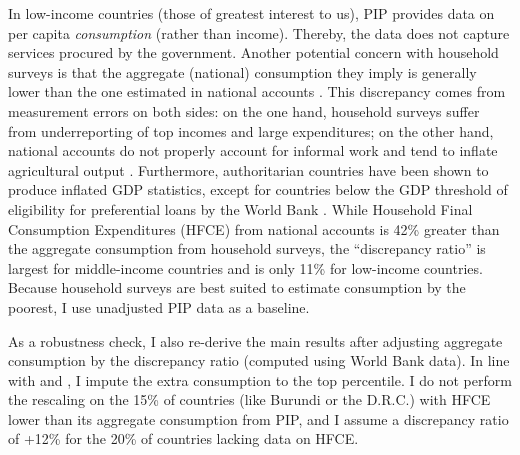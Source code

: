 In low-income countries (those of greatest interest to us), PIP provides data on per capita \textit{consumption} (rather than income). Thereby, the data does not capture services procured by the government. %
Another potential concern with household surveys is that the aggregate (national) consumption they imply is generally lower than the one estimated in national accounts \citep{deaton_measuring_2005,prydz_disparities_2022,hlasny_impact_2022}. This discrepancy comes from measurement errors on both sides: on the one hand, household surveys suffer from underreporting of top incomes and large expenditures; on the other hand, national accounts do not properly account for informal work %
and tend to inflate agricultural output \citep{angrist_why_2021}. 
Furthermore, authoritarian countries have been shown to produce inflated GDP statistics, except for countries below the GDP threshold of eligibility for preferential loans by the World Bank \citep{martinez_how_2022}. %
While Household Final Consumption Expenditures (HFCE) from national accounts is 42\% greater than the aggregate consumption from household surveys, the ``discrepancy ratio'' is largest for middle-income countries and is only 11\% for low-income countries. 
Because household surveys are best suited to estimate consumption by the poorest, I use unadjusted PIP data as a baseline. 

As a robustness check, I also re-derive the main results after adjusting aggregate consumption by the discrepancy ratio (computed using World Bank data). In line with \cite{lakner_global_2013} and \cite{anand_chapter_2015}, I impute the extra consumption to the top percentile. I do not perform the rescaling on the 15\% of countries (like Burundi or the D.R.C.) with HFCE lower than its aggregate consumption from PIP, and I assume a discrepancy ratio of +12\% for the 20\% of countries lacking data on HFCE. 

